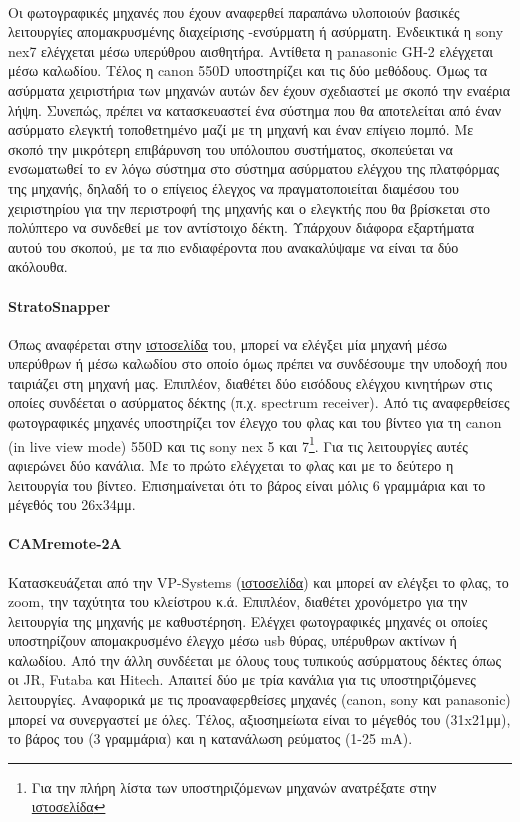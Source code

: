 \documentclass[a4paper, 12pt, twoside]{report}
\begin{document}
{{{{{{			\paragraph{}{Οι φωτογραφικές μηχανές που έχουν αναφερθεί παραπάνω υλοποιούν βασικές λειτουργίες απομακρυσμένης διαχείρισης -ενσύρματη ή ασύρματη. Ενδεικτικά η sony nex7 ελέγχεται μέσω υπερύθρου αισθητήρα. Αντίθετα η panasonic GH-2 ελέγχεται μέσω καλωδίου. Τέλος η canon 550D υποστηρίζει και τις δύο μεθόδους. Όμως τα ασύρματα χειριστήρια των μηχανών αυτών δεν έχουν σχεδιαστεί με σκοπό την εναέρια λήψη. Συνεπώς, πρέπει να κατασκευαστεί ένα σύστημα που θα αποτελείται από έναν ασύρματο ελεγκτή τοποθετημένο μαζί με τη μηχανή και έναν επίγειο πομπό. Με σκοπό την μικρότερη επιβάρυνση του υπόλοιπου συστήματος, σκοπεύεται να ενσωματωθεί το εν λόγω σύστημα στο σύστημα ασύρματου ελέγχου της πλατφόρμας της μηχανής, δηλαδή το ο επίγειος έλεγχος να πραγματοποιείται διαμέσου του χειριστηρίου για την περιστροφή της μηχανής και ο ελεγκτής που θα βρίσκεται στο πολύπτερο να συνδεθεί με τον αντίστοιχο δέκτη. Υπάρχουν διάφορα εξαρτήματα αυτού του σκοπού, με τα πιο ενδιαφέροντα που ανακαλύψαμε να είναι τα δύο ακόλουθα.
			}
			\paragraph{StratoSnapper}{Όπως αναφέρεται στην \href{http://littlesmartthings.com/stratosnapper/}{ιστοσελίδα} του, μπορεί να ελέγξει μία μηχανή μέσω υπερύθρων ή μέσω καλωδίου στο οποίο όμως πρέπει να συνδέσουμε την υποδοχή που ταιριάζει στη μηχανή μας. Επιπλέον, διαθέτει δύο εισόδους ελέγχου κινητήρων στις οποίες συνδέεται ο ασύρματος δέκτης (π.χ. spectrum receiver). Από τις αναφερθείσες φωτογραφικές μηχανές υποστηρίζει τον έλεγχο του φλας και του βίντεο για τη canon (in live view mode) 550D και τις sony nex 5 και 7\footnote{Για την πλήρη λίστα των υποστηριζόμενων μηχανών ανατρέξατε στην \href{http://littlesmartthings.com/stratosnapper-supported-cameras/}{ιστοσελίδα}}. Για τις λειτουργίες αυτές αφιερώνει δύο κανάλια. Με το πρώτο ελέγχεται το φλας και με το δεύτερο η λειτουργία του βίντεο. Επισημαίνεται ότι το βάρος είναι μόλις 6 γραμμάρια και το μέγεθός του 26x34μμ.
			}
			\paragraph{CAMremote-2A}{Κατασκευάζεται από την VP-Systems (\href{http://vp-systems.eu/camremote.html}{ιστοσελίδα}) και μπορεί αν ελέγξει το φλας, το zoom, την ταχύτητα του κλείστρου κ.ά. Επιπλέον, διαθέτει χρονόμετρο για την λειτουργία της μηχανής με καθυστέρηση. Ελέγχει φωτογραφικές μηχανές οι οποίες υποστηρίζουν απομακρυσμένο έλεγχο μέσω usb θύρας, υπέρυθρων ακτίνων ή καλωδίου. Από την άλλη συνδέεται με όλους τους τυπικούς ασύρματους δέκτες όπως οι JR, Futaba και Hitech. Απαιτεί δύο με τρία κανάλια για τις υποστηριζόμενες λειτουργίες. Αναφορικά με τις προαναφερθείσες μηχανές (canon, sony και panasonic) μπορεί να συνεργαστεί με όλες. Τέλος, αξιοσημείωτα είναι το μέγεθός του (31x21μμ), το βάρος του (3 γραμμάρια) και η κατανάλωση ρεύματος (1-25 mA).
			}
		
}}}}}}
\end{document}
